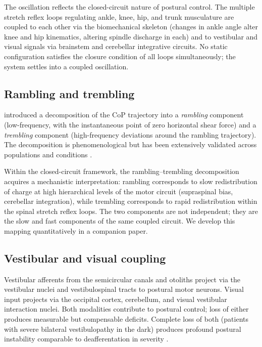 \documentclass[11pt,twocolumn,a4paper]{article}
\theoremstyle{definition}
\theoremstyle{remark}
\begin{document}
The oscillation reflects the closed-circuit nature of postural control.
The multiple stretch reflex loops regulating ankle, knee, hip, and
trunk musculature are coupled to each other via the biomechanical
skeleton (changes in ankle angle alter knee and hip kinematics,
altering spindle discharge in each) and to vestibular and visual
signals via brainstem and cerebellar integrative circuits. No static
configuration satisfies the closure condition of all loops
simultaneously; the system settles into a coupled oscillation.

\subsection{Rambling and trembling}

\citet{zatsiorsky2000,zatsiorsky2003} introduced a decomposition of
the CoP trajectory into a \emph{rambling} component
(low-frequency, with the instantaneous point of zero horizontal shear
force) and a \emph{trembling} component (high-frequency deviations
around the rambling trajectory). The decomposition is phenomenological
but has been extensively validated across populations and conditions
\citep{duarte2008}.

Within the closed-circuit framework, the rambling--trembling
decomposition acquires a mechanistic interpretation: rambling
corresponds to slow redistribution of charge at high hierarchical
levels of the motor circuit (supraspinal bias, cerebellar integration),
while trembling corresponds to rapid redistribution within the spinal
stretch reflex loops. The two components are not independent; they
are the slow and fast components of the same coupled circuit. We
develop this mapping quantitatively in a companion paper.

\subsection{Vestibular and visual coupling}

Vestibular afferents from the semicircular canals and otoliths project
via the vestibular nuclei and vestibulospinal tracts to postural motor
neurons. Visual input projects via the occipital cortex, cerebellum,
and visual vestibular interaction nuclei. Both modalities contribute
to postural control; loss of either produces measurable but
compensable deficits. Complete loss of both (patients with severe
bilateral vestibulopathy in the dark) produces profound postural
instability comparable to deafferentation in severity
\citep{horak2006,cullen2012}.
\end{document}
